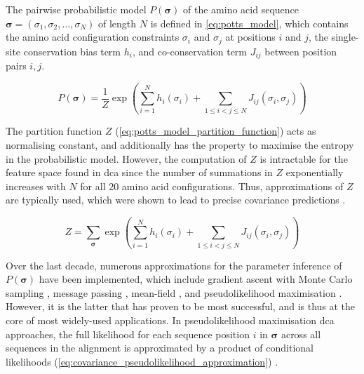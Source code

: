 The pairwise probabilistic model $P(\boldsymbol{\sigma})$ of the amino acid sequence $\boldsymbol{\sigma}=\left(\sigma_1,\sigma_2,\dots,\sigma_N\right)$ of length $N$ is defined in \cref{eq:potts_model}, which contains the amino acid configuration constraints $\sigma_i$ and $\sigma_j$ at positions $i$ and $j$, the single-site conservation bias term $h_i$, and co-conservation term $J_{ij}$ between position pairs $i,j$. 

\begin{equation}
    P(\boldsymbol{\sigma})=\frac{1}{Z}\exp\left(\sum_{i=1}^{N}h_i\left(\sigma_i\right)+\sum_{1 \leqslant i < j \leqslant N}J_{ij}\left(\sigma_i, \sigma_j\right)\right)
    \label{eq:potts_model}
\end{equation}

The partition function $Z$ (\cref{eq:potts_model_partition_function}) acts as normalising constant, and additionally has the property to maximise the entropy in the probabilistic model. However, the computation of $Z$ is intractable for the feature space found in \gls{dca} since the number of summations in $Z$ exponentially increases with $N$ for all 20 amino acid configurations. Thus, approximations of $Z$ are typically used, which were shown to lead to precise covariance predictions \cite{Ekeberg2013-ay}.

\begin{equation}
    Z=\sum_{\boldsymbol{\sigma}}^{ }\exp\left(\sum_{i=1}^{N}h_i\left(\sigma_i\right)+\sum_{1 \leqslant i < j \leqslant N}J_{ij}\left(\sigma_i, \sigma_j\right)\right)
    \label{eq:potts_model_partition_function}
\end{equation}

Over the last decade, numerous approximations for the parameter inference of $P(\boldsymbol{\sigma})$ have been implemented, which include gradient ascent with Monte Carlo sampling \cite{Lapedes2012-tu}, message passing \cite{Weigt2009-sx}, mean-field \cite{Marks2011-os,Morcos2011-lk,Jones2012-ks,Stein2015-cw}, and pseudolikelihood maximisation \cite{Balakrishnan2011-wh,Ekeberg2013-ay,Kamisetty2013-le,Seemayer2014-zp,Hopf2015-vf}. However, it is the latter that has proven to be most successful, and is thus at the core of most widely-used applications. In pseudolikelihood maximisation \gls{dca} approaches, the full likelihood for each sequence position $i$ in $\boldsymbol{\sigma}$ across all sequences in the alignment is approximated by a product of conditional likelihoods (\cref{eq:covariance_pseudolikelihood_approximation}) \cite{Hopf2017-pp}.

